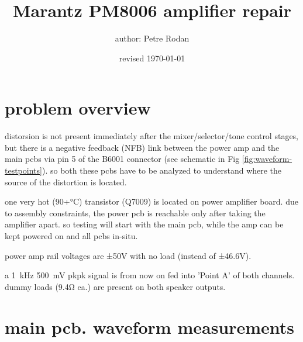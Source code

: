 \documentclass[a4paper,twoside,notitlepage]{article}
\makeatletter
\newcommand*{\toccontents}{\@starttoc{toc}}
\makeatother
\begin{document}
\title{\textbf{Marantz PM8006} amplifier repair}
\author{author: Petre Rodan}
\date{revised \today}
\maketitle

%


\toccontents

\section{problem overview} \label{sec:problem-overview}

distorsion is not present immediately after the mixer/selector/tone control stages, but there is a negative feedback (NFB) link between the power amp and the main pcbs via pin 5 of the B6001 connector (see schematic in Fig \ref{fig:waveform-testpoints}). so both these pcbs have to be analyzed to understand where the source of the distortion is located.


one very hot (90+\si{\celsius}) transistor (Q7009) is located on power amplifier board. due to assembly constraints, the power pcb is reachable only after taking the amplifier apart. so testing will start with the main pcb, while the amp can be kept powered on and all pcbs in-situ.

power amp rail voltages are ±50V with no load (instead of ±46.6V).

a \SI{1}{\kilo\hertz} \SI{500}{\milli\volt} pkpk signal is from now on fed into 'Point A' of both channels. dummy loads (9.4\si{\ohm} ea.) are present on both speaker outputs.

\clearpage
\section{main pcb. waveform measurements} \label{sec:waveform-measurements}
\end{document}
